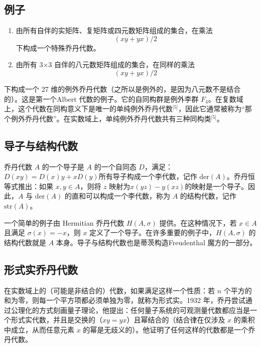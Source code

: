 \subsection{例子}
\begin{enumerate}
\item 由所有自伴的实矩阵、复矩阵或四元数矩阵组成的集合，在乘法
$$
(xy + yx) / 2~
$$
下构成一个特殊乔丹代数。
\item 由所有 3×3 自伴的八元数矩阵组成的集合，在同样的乘法
$$
(xy + yx) / 2~
$$
\end{enumerate}
下构成一个 27 维的例外乔丹代数（之所以是例外的，是因为八元数不是结合的）。这是第一个Albert 代数的例子。它的自同构群是例外李群 $F_4$。在复数域上，这个代数在同构意义下是唯一的单纯例外乔丹代数\(^\text{[5]}\)，因此它通常被称为“那个例外乔丹代数”。在实数域上，单纯例外乔丹代数共有三种同构类\(^\text{[5]}\)。
\subsection{导子与结构代数}
乔丹代数 $A$ 的一个导子是 $A$ 的一个自同态 $D$，满足：$D(xy) = D(x)y + xD(y)$所有导子构成一个李代数，记作 $\mathrm{der}(A)$。乔丹恒等式推出：如果 $x, y \in A$，则将 $z$ 映射为$x(yz) - y(xz)$的映射是一个导子。因此，$A$ 与 $\mathrm{der}(A)$ 的直和可以构成一个李代数，称为 $A$ 的结构代数，记作 $\mathrm{str}(A)$。

一个简单的例子由 Hermitian 乔丹代数 $H(A, \sigma)$ 提供。在这种情况下，若 $x \in A$ 且满足 $\sigma(x) = -x$，则 $x$ 定义了一个导子。在许多重要的例子中，$H(A, \sigma)$ 的结构代数就是 $A$ 本身。导子与结构代数也是蒂茨构造Freudenthal 魔方的一部分。
\subsection{形式实乔丹代数}
在实数域上的（可能是非结合的）代数，如果满足这样一个性质：若 $n$ 个平方的和为零，则每一个平方项都必须单独为零，就称为形式实。1932 年，乔丹尝试通过公理化的方式刻画量子理论，他提出：任何量子系统的可观测量代数都应当是一个形式实代数，并且是交换的（$xy = yx$）且幂结合的（结合律在仅涉及 $x$ 的乘积中成立，从而任意元素 $x$ 的幂是无歧义的）。他证明了任何这样的代数都是一个乔丹代数。

